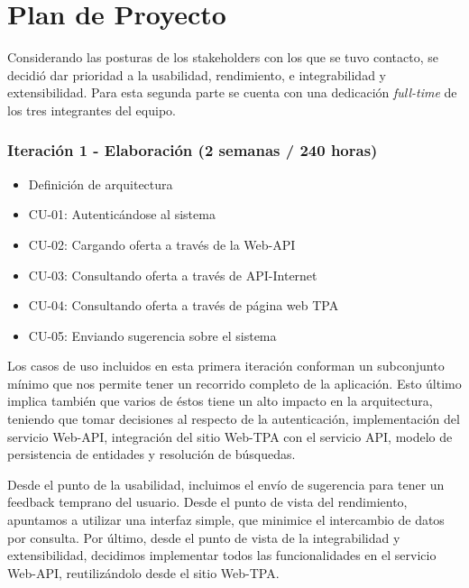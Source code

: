 \section*{Plan de Proyecto}

Considerando las posturas de los stakeholders con los que se tuvo contacto, se decidi\'o dar prioridad a la usabilidad, rendimiento, e integrabilidad y extensibilidad. Para esta segunda parte se cuenta con una dedicaci\'on \textit{full-time} de los tres integrantes del equipo.

\subsubsection{Iteraci\'on 1 - Elaboraci\'on (2 semanas / 240 horas)}	
	
	\begin{itemize}
		  \item Definici\'on de arquitectura
		  \item CU-01: Autentic\'andose al sistema
		  \item CU-02: Cargando oferta a trav\'es de la Web-API
		  \item CU-03: Consultando oferta a trav\'es de API-Internet
		  \item CU-04: Consultando oferta a trav\'es de p\'agina web TPA
		  \item CU-05: Enviando sugerencia sobre el sistema
	\end{itemize}

	Los casos de uso incluidos en esta primera iteraci\'on conforman un subconjunto m\'inimo que nos permite tener un recorrido completo de la aplicación. Esto \'ultimo implica tambi\'en que varios de \'estos tiene un alto impacto en la arquitectura, teniendo que tomar decisiones al respecto de la autenticaci\'on, implementaci\'on del servicio Web-API, integraci\'on del sitio Web-TPA con el servicio API, modelo de persistencia de entidades y resoluci\'on de b\'usquedas.
	
	Desde el punto de la usabilidad, incluimos el env\'io de sugerencia para tener un feedback temprano del usuario. Desde el punto de vista del rendimiento, apuntamos a utilizar una interfaz simple, que minimice el intercambio de datos por consulta. Por \'ultimo, desde el punto de vista de la integrabilidad y extensibilidad, decidimos implementar todos las funcionalidades en el servicio Web-API, reutilizándolo desde el sitio Web-TPA.
	
